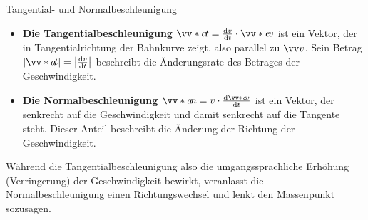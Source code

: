 \begin{rememberbox}{Tangential- und Normalbeschleunigung}
    \begin{itemize}
        \item \textbf{Die Tangentialbeschleunigung $\ivecS{a}{t} = \frac{\dd v}{\dd t} \cdot \ivecS{e}{v}$} ist ein Vektor, der in Tangentialrichtung der Bahnkurve zeigt, also parallel zu $\ivec{v}$. Sein Betrag $|\ivecS{a}{t}| = \left|\frac{\dd v}{\dd t}\right|$ beschreibt die Änderungsrate des Betrages der Geschwindigkeit.
        \item \textbf{Die Normalbeschleunigung $\ivecS{a}{n} = v \cdot \frac{\dd\ivecS{e}{v}}{\dd t}$} ist ein Vektor, der senkrecht auf die Geschwindigkeit und damit senkrecht auf die Tangente steht. Dieser Anteil beschreibt die Änderung der Richtung der Geschwindigkeit.
    \end{itemize}
\end{rememberbox}
Während die Tangentialbeschleunigung also die umgangssprachliche Erhöhung (\bzw Verringerung) der Geschwindigkeit bewirkt, veranlasst die Normalbeschleunigung einen Richtungswechsel und lenkt den Massenpunkt sozusagen. 

\newpage